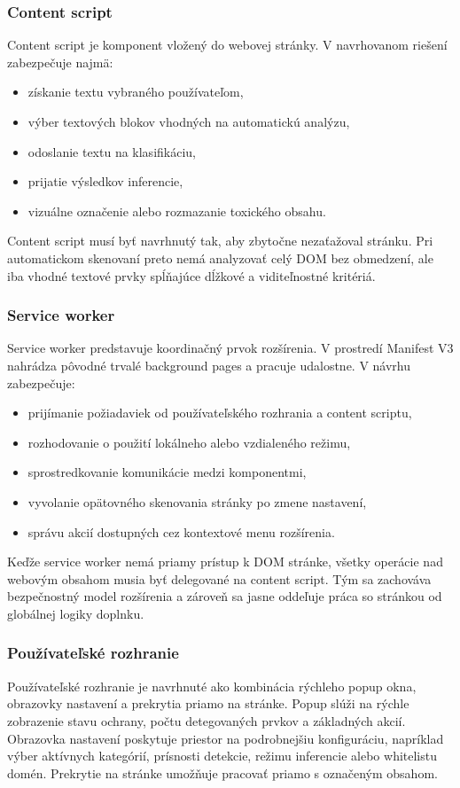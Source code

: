 \subsubsection{Content script}
Content script je komponent vložený do webovej stránky. V navrhovanom riešení zabezpečuje najmä:
\begin{itemize}
  \item získanie textu vybraného používateľom,
  \item výber textových blokov vhodných na automatickú analýzu,
  \item odoslanie textu na klasifikáciu,
  \item prijatie výsledkov inferencie,
  \item vizuálne označenie alebo rozmazanie toxického obsahu.
\end{itemize}

Content script musí byť navrhnutý tak, aby zbytočne nezaťažoval stránku. Pri automatickom skenovaní preto nemá analyzovať celý DOM bez obmedzení, ale iba vhodné textové prvky spĺňajúce dĺžkové a viditeľnostné kritériá.

\subsubsection{Service worker}
Service worker predstavuje koordinačný prvok rozšírenia. V prostredí Manifest V3 nahrádza pôvodné trvalé background pages a pracuje udalostne. V návrhu zabezpečuje:
\begin{itemize}
  \item prijímanie požiadaviek od používateľského rozhrania a content scriptu,
  \item rozhodovanie o použití lokálneho alebo vzdialeného režimu,
  \item sprostredkovanie komunikácie medzi komponentmi,
  \item vyvolanie opätovného skenovania stránky po zmene nastavení,
  \item správu akcií dostupných cez kontextové menu rozšírenia.
\end{itemize}

Keďže service worker nemá priamy prístup k DOM stránke, všetky operácie nad webovým obsahom musia byť delegované na content script. Tým sa zachováva bezpečnostný model rozšírenia a zároveň sa jasne oddeľuje práca so stránkou od globálnej logiky doplnku.

\subsubsection{Používateľské rozhranie}
Používateľské rozhranie je navrhnuté ako kombinácia rýchleho popup okna, obrazovky nastavení a prekrytia priamo na stránke. Popup slúži na rýchle zobrazenie stavu ochrany, počtu detegovaných prvkov a základných akcií. Obrazovka nastavení poskytuje priestor na podrobnejšiu konfiguráciu, napríklad výber aktívnych kategórií, prísnosti detekcie, režimu inferencie alebo whitelistu domén. Prekrytie na stránke umožňuje pracovať priamo s označeným obsahom.

